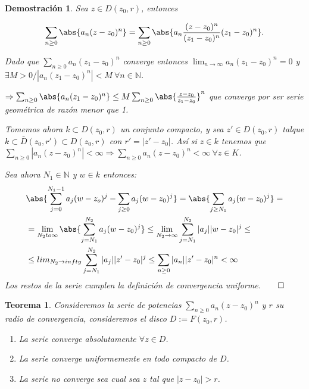 \documentclass[12pt]{book}
\newtheorem{theorem}{Teorema}[chapter]
\newtheorem*{dem}{Demostración}
\newcommand{\N}{\mathbb{N}}
\begin{document}
\begin{dem}
Sea $z\in D(z_0,r)$, entonces  

$$\sum_{n\geq 0} \abs{a_n(z-z_0)^n} = \sum_{n\geq 0}\abs{a_n\frac{(z-z_0)^n}{(z_1-z_0)^n}(z_1-z_0)^n}.$$

Dado que  $\sum_{n\geq 0} a_n(z_1-z_0)^n$ converge entonces $\lim_{n\to \infty} a_n(z_1-z_0)^n =0$ y $\exists M>0 / |a_n(z_1-z_0)^n|<M\ \forall n\in\N$.

$\Rightarrow \sum_{n\geq 0} \abs{a_n(z_1-z_0)^n} \leq M\sum_{n\geq 0} \abs{\frac{z-z_0}{z_1-z_0}}^n$ que converge por ser serie geométrica de razón menor que 1.

Tomemos ahora $k\subset D(z_0,r)$ un conjunto compacto, y sea $z' \in D(z_0,r)$ talque $k\subset \bar{D}(z_0,r')\subset D(z_0,r)$ con $r' = |z'-z_0|$.
Así si $z\in k$ tenemos que $\sum_{n\geq 0} |a_n(z-z_0)^n| <\infty \Rightarrow \sum_{n\geq 0} a_n(z-z_0)^n < \infty\ \forall z \in K$.

Sea ahora $N_1 \in \N$ y $w \in k$ entonces:
\begin{align*}
&\abs{ \sum_{j=0}^{N_1-1} a_j(w-z_o)^j - \sum_{j\geq 0}a_j(w-z_0)^j } = \abs{ \sum_{j\geq N_1}a_j(w-z_0)^j  } =\\
&=\lim_{N_2 to \infty} \abs{ \sum_{j = N_1}^{N_2}a_j(w-z_0)^j  } \leq \lim_{N_2\to \infty} \sum_{j=N_1}^{N_2}|a_j||w-z_0|^j \leq\\
&\leq lim_{N_2 \to infty} \sum_{j=N_1}^{N_2}|a_j||z'-z_0|^j \leq \sum_{n\geq 0}|a_n||z'-z_0|^n < \infty
\end{align*}
Los restos de la serie cumplen la definición de convergencia uniforme.$\qed$
\end{dem}

\begin{theorem}
Consideremos la serie de potencias $\sum_{n\geq 0} a_n(z-z_0)^n$ y $r$ su radio de convergencia, consideremos el disco $D := F(z_0,r)$.
\begin{enumerate}
\item La serie converge absolutamente $\forall z \in D$.
\item La serie converge uniformemente en todo compacto de $D$.
\item La serie no converge sea cual sea $z$ tal que $|z-z_0|>r$.
\end{enumerate}
\end{theorem}
\end{document}
